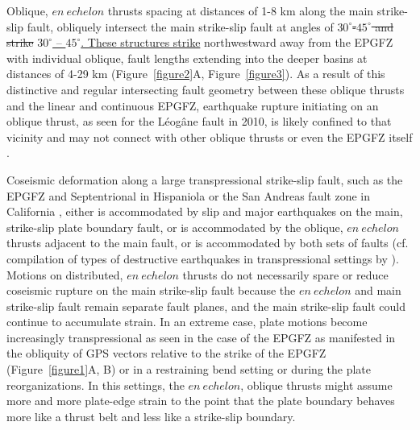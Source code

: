 \documentclass[linenumbers,draft]{agujournal}
\providecommand{\DIFdel}[1]{{\protect\color{red}\sout{#1}}}                      %
\providecommand{\DIFaddbegin}{} %
\providecommand{\DIFaddend}{} %
\providecommand{\DIFdelbegin}{} %
\providecommand{\DIFdelend}{} %
\begin{document}
Oblique, $en~echelon$ thrusts spacing at distances of 1-8 km along the main strike-slip fault, obliquely intersect the main strike-slip fault at angles of \DIFdelbegin \DIFdel{$30^{\circ}$-$45^{\circ}$ and strike }\DIFdelend \DIFaddbegin \ul{$30^{\circ}$ -- $45^{\circ}$. These structures strike} \DIFaddend northwestward away from the EPGFZ with individual oblique, fault lengths extending into the deeper basins at distances of 4-29 km (Figure~\ref{figure2}A, Figure~\ref{figure3}).  As a result of this distinctive and regular intersecting fault geometry between these oblique thrusts and the linear and continuous EPGFZ, earthquake rupture initiating on an oblique thrust, as seen for the L\'eog\^ane fault in 2010, is likely confined to that vicinity and may not connect with other oblique thrusts or even the EPGFZ itself \citep{douilly2013crustal,douilly2015three}.

Coseismic deformation along a large transpressional strike-slip fault, such as the EPGFZ and Septentrional \citep{calais2002strain} in Hispaniola or the San Andreas fault zone in California \citep{segall1990surface}, either is accommodated by slip and major earthquakes on the main, strike-slip plate boundary fault, or is accommodated by the oblique, $en~echelon$ thrusts adjacent to the main fault, or is accommodated by both sets of faults (cf. compilation of types of destructive earthquakes in transpressional settings by \citet{hayes2010complex}). Motions on distributed, $en~echelon$ thrusts do not necessarily spare or reduce coseismic rupture on the main strike-slip fault because the $en~echelon$ and main strike-slip fault remain separate fault planes, and the main strike-slip fault could continue to accumulate strain. In an extreme case, plate motions become increasingly transpressional as seen in the case of the EPGFZ as manifested in the obliquity of GPS vectors relative to the strike of the EPGFZ (Figure~\ref{figure1}A, B) or in a restraining bend setting or during the plate reorganizations. In this settings, the $en~echelon$, oblique thrusts might assume more and more plate-edge strain to the point that the plate boundary behaves more like a thrust belt and less like a strike-slip boundary.
\end{document}
